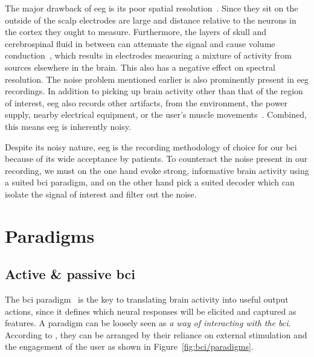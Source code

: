 The major drawback of \ac{eeg} is its poor spatial resolution~\cite{Ferree2001}.
Since they sit on the outside of the scalp electrodes are large and distance
relative to the neurons in the cortex they ought to measure.
Furthermore, the layers of skull and cerebrospinal fluid in between can
attenuate the signal and cause volume conduction~\cite{Broek1998}, which results in electrodes
measuring a mixture of activity from sources elsewhere in the brain.
This also has a negative effect on spectral resolution.
The noise problem mentioned earlier is also prominently present in \ac{eeg}
recordings.
In addition to picking up brain activity other than that of the region of
interest, \ac{eeg} also records other artifacts, from the environment, the power
supply, nearby electrical equipment, or the user's muscle
movements~\cite{Urigueen2015}.
Combined, this means \ac{eeg} is inherently noisy.

Despite its noisy nature, \ac{eeg} is the recording methodology of choice for
our \ac{bci} because of its wide acceptance by patients.
To counteract the noise present in our recording, we must on the one hand evoke
strong, informative brain activity using a suited \ac{bci} paradigm, and on the
other hand pick a suited decoder which can isolate the signal of interest and
filter out the noise.

\section{Paradigms}
\label{sec:bci/paradigms}

\subsection{Active \& passive \ac{bci}}

The \ac{bci} paradigm~\cite{Xu2021,Neeling2019} is the key to translating brain activity into useful
output actions, since it defines which neural responses will be elicited and
captured as features.
A paradigm can be loosely seen as \emph{a way of interacting with the
\ac{bci}}.
According to \textcite{Zander2011}, they can be arranged by their reliance on
external stimulation and the engagement of the user as shown in
Figure~\ref{fig:bci/paradigms}.



